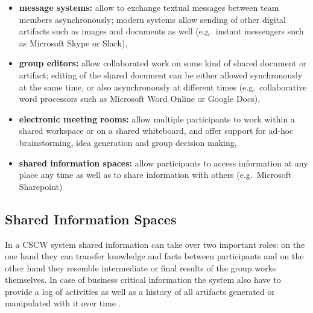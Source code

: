\begin{itemize}
  \item \textbf{message systems:} allow to exchange textual messages between team members asynchronously; modern systems allow sending of other digital artifacts such as images and documents as well (e.g.\ instant messengers such as Microsoft Skype or Slack),
  \item \textbf{group editors:} allow collaborated work on some kind of shared document or artifact; editing of the shared document can be either allowed synchronously at the same time, or also asynchronously at different times (e.g.\ collaborative word processors such as Microsoft Word Online or Google Docs),
  \item \textbf{electronic meeting rooms:} allow multiple participants to work within a shared workspace or on a shared whiteboard, and offer support for ad-hoc brainstorming, idea generation and group decision making,
  \item \textbf{shared information spaces:} allow participants to access information at any place any time as well as to share information with others (e.g.\ Microsoft Sharepoint)
\end{itemize}


\subsection{Shared Information Spaces}
\label{sec:cscw_shared_spaces}

In a \gls{CSCW} system shared information can take over two important roles: on the one hand they can transfer knowledge and facts between participants and on the other hand they resemble intermediate or final results of the group works themselves. In case of business critical information the system also have to provide a log of activities as well as a history of all artifacts generated or manipulated with it over time \citep[pg. 295]{borghoff2000computer}. \\

